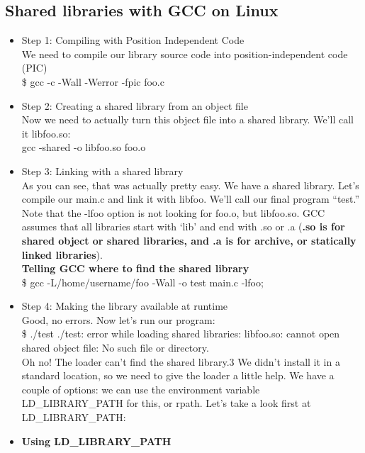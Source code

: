 \documentclass[a4paper, 12pt]{article}
\begin{document}
    \subsection{Shared libraries with GCC on Linux} 
    \begin{itemize} 
        \item Step 1: Compiling with Position Independent Code\\
            We need to compile our library source code into position-independent code (PIC)\\
            \textsf{\$ gcc -c -Wall -Werror -fpic foo.c}
        \item Step 2: Creating a shared library from an object file\\
            Now we need to actually turn this object file into a shared library. We’ll call it libfoo.so:\\
            \textsf{gcc -shared -o libfoo.so foo.o}
        \item Step 3: Linking with a shared library\\
            As you can see, that was actually pretty easy. We have a shared library. 
            Let’s compile our main.c and link it with libfoo. We’ll call our final program “test.” 
            Note that the -lfoo option is not looking for foo.o, but libfoo.so. 
            GCC assumes that all libraries start with ‘lib’ and end with .so or .a 
            (\textbf{.so is for shared object or shared libraries, and .a is for archive, or statically linked libraries}).\\
            \textbf{Telling GCC where to find the shared library}\\
            \textsf{\$ gcc -L/home/username/foo -Wall -o test main.c -lfoo};\\
        \item Step 4: Making the library available at runtime\\
            Good, no errors. Now let’s run our program:\\
            \textsf{\$ ./test ./test: error while loading shared libraries: libfoo.so: cannot open shared object file: No such file or directory.}\\
            Oh no! The loader can’t find the shared library.3 We didn’t install it in a standard location, so we need to give the loader a little help. We have a couple of options: we can use the environment variable LD\_LIBRARY\_PATH for this, or rpath. Let’s take a look first at LD\_LIBRARY\_PATH:
        \item \textbf{Using LD\_LIBRARY\_PATH}\\

\end{itemize}
\end{document}
